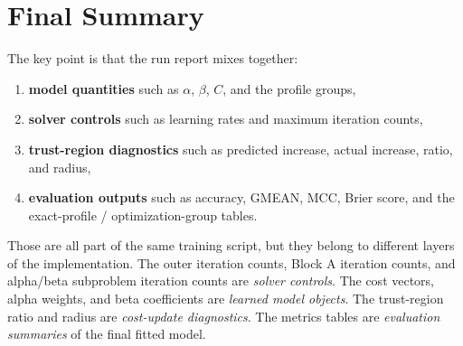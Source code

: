 \documentclass[11pt]{article}
\begin{document}
\section{Final Summary}
The key point is that the run report mixes together:
\begin{enumerate}
\item \textbf{model quantities} such as $\alpha$, $\beta$, $C$, and the
profile groups,
\item \textbf{solver controls} such as learning rates and maximum iteration
counts,
\item \textbf{trust-region diagnostics} such as predicted increase, actual
increase, ratio, and radius,
\item \textbf{evaluation outputs} such as accuracy, GMEAN, MCC, Brier score, and the
exact-profile / optimization-group tables.
\end{enumerate}

Those are all part of the same training script, but they belong to different
layers of the implementation. The outer iteration counts, Block A iteration
counts, and alpha/beta subproblem iteration counts are \emph{solver controls}.
The cost vectors, alpha weights, and beta coefficients are \emph{learned model
objects}. The trust-region ratio and radius are \emph{cost-update diagnostics}.
The metrics tables are \emph{evaluation summaries} of the final fitted model.
\end{document}
